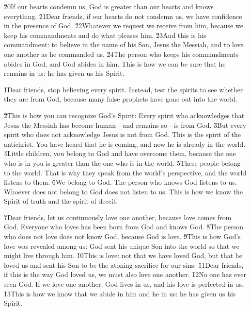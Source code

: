 \v{20}If our hearts condemn us, God is greater than our hearts and knows everything. \v{21}Dear friends, if our hearts do not condemn us, we have confidence in the presence of God. \v{22}Whatever we request we receive from him, because we keep his commandments and do what pleases him. \v{23}And this is his commandment: to believe in the name of his Son, Jesus the Messiah, and to love one another as he commanded us. \v{24}The person who keeps his commandments abides in God, and God abides in him. This is how we can be sure that he remains in us: he has given us his Spirit.

\v{1}Dear friends, stop believing every spirit. Instead, test the spirits to see whether they are from God, because many false prophets have gone out into the world.

\v{2}This is how you can recognize God's Spirit: Every spirit who acknowledges that Jesus the Messiah has become human---and remains so---is from God. \v{3}But every spirit who does not acknowledge Jesus is not from God. This is the spirit of the antichrist. You have heard that he is coming, and now he is already in the world. \v{4}Little children, you belong to God and have overcome them, because the one who is in you is greater than the one who is in the world. \v{5}These people belong to the world. That is why they speak from the world's perspective, and the world listens to them. \v{6}We belong to God. The person who knows God listens to us. Whoever does not belong to God does not listen to us. This is how we know the Spirit of truth and the spirit of deceit.

\v{7}Dear friends, let us continuously love one another, because love comes from God. Everyone who loves has been born from God and knows God. \v{8}The person who does not love does not know God, because God is love. \v{9}This is how God's love was revealed among us: God sent his unique Son into the world so that we might live through him. \v{10}This is love: not that we have loved God, but that he loved us and sent his Son to be the atoning sacrifice for our sins. \v{11}Dear friends, if this is the way God loved us, we must also love one another. \v{12}No one has ever seen God. If we love one another, God lives in us, and his love is perfected in us. \v{13}This is how we know that we abide in him and he in us: he has given us his Spirit.

